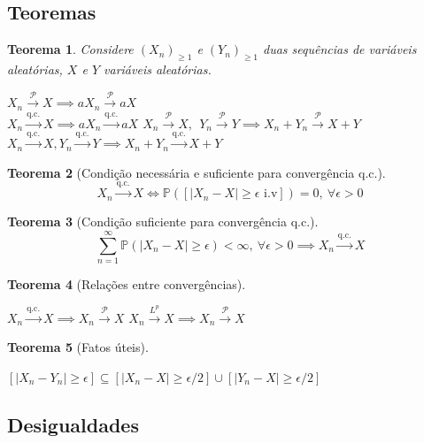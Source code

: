 \documentclass[12pt,a4paper,answers]{article}
\numberwithin{equation}{section} %
\renewcommand{\P}{\mathbb{P}}
\newcommand{\toQC}{\xrightarrow{\text{q.c.}}} %
\newcommand{\toP}{\xrightarrow{\mathcal{P}}}
\newcommand{\toL}{\xrightarrow{L^p}}
\theoremstyle{thm_estilo}
\newtheorem{theorem}{Teorema}[section]
\theoremstyle{thm_note_est}
\begin{document}
\subsection{Teoremas}

\begin{theorem}
	Considere $(X_n)_{\geq1}$ e $(Y_n)_{\geq1}$ duas sequências de variáveis aleatórias, $X$ e $Y$ variáveis aleatórias.
	\begin{outline}[enumerate]
		\1 $X_n\toP X \implies aX_n \toP aX$ \\
		   $X_n\toQC X \implies aX_n \toQC aX$  
		\1 $X_n\toP X, \ \ Y_n\toP Y \implies X_n+Y_n\toP X+Y$ \\
		   $X_n\toQC X, Y_n\toQC Y \implies X_n+Y_n\toQC X+Y$
	\end{outline}
\end{theorem}

\begin{theorem}[Condição necessária e suficiente para convergência q.c.]
	\begin{equation}
		X_n\toQC X \iff \P([|X_n-X|\geq\epsilon \text{ i.v}]) = 0, \ \forall \epsilon>0
	\end{equation}
\end{theorem}

\begin{theorem}[Condição suficiente para convergência q.c.]
	\begin{equation}
		 \sum_{n=1}^{\infty}\P(|X_n-X|\geq\epsilon) < \infty, \ \forall \epsilon>0 \implies X_n\toQC X
	\end{equation}
\end{theorem}

\begin{theorem}[Relações entre convergências]
	\leavevmode
	\begin{outline}[enumerate]
		\1 \( X_n\toQC X \implies X_n\toP X \)
		\1 \( X_n \toL X \implies X_n \toP X \) 
	\end{outline}
\end{theorem}


\begin{theorem}[Fatos úteis]
	\leavevmode
	\begin{outline}[enumerate]
		\1 \( [|X_n-Y_n| \geq \epsilon] \subseteq [|X_n-X| \geq \epsilon/2]\cup 
		  [|Y_n-X| \geq \epsilon/2] \) 
	\end{outline}
\end{theorem}


\subsection{Desigualdades}
\end{document}
